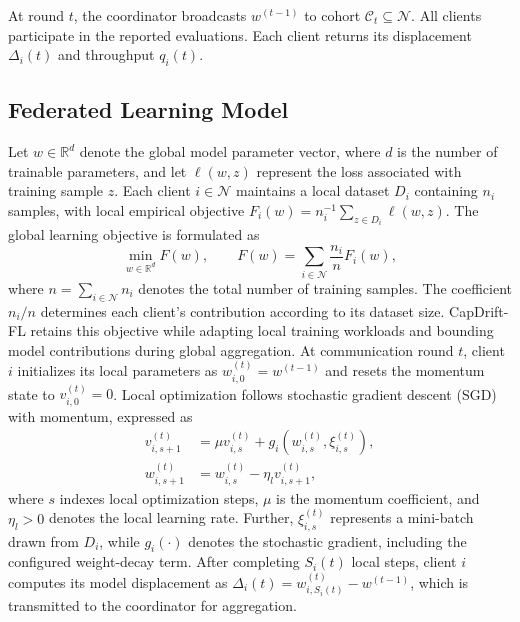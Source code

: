 \documentclass[conference]{IEEEtran}
\begin{document}
At round $t$, the coordinator broadcasts $w^{(t-1)}$ to cohort $\mathcal{C}_t\subseteq\mathcal{N}$. All clients participate in the reported evaluations. Each client returns its displacement $\Delta_i(t)$ and throughput $q_i(t)$.

\subsection{Federated Learning Model}
\label{subsec:learning}
Let $w\in\mathbb{R}^d$ denote the global
model parameter vector, where $d$ is the
number of trainable parameters, and let
$\ell(w,z)$ represent the loss associated with training sample $z$. Each client $i\in\mathcal{N}$ maintains a local dataset $D_i$ containing
$n_i$ samples, with local empirical objective
$F_i(w)=n_i^{-1}\sum_{z\in D_i}\ell(w,z)$.
The global learning objective is formulated as
\begin{equation}
\min_{w\in\mathbb{R}^d}
F(w), \qquad
F(w)=\sum_{i\in\mathcal{N}}
\frac{n_i}{n}F_i(w),
\label{eq:objective}
\end{equation}
where $n=\sum_{i\in\mathcal{N}}n_i$
denotes the total number of training samples. The coefficient $n_i/n$
determines each client's contribution according to its dataset size.
CapDrift-FL retains this objective while adapting local training workloads and bounding model contributions during global aggregation.
At communication round $t$, client $i$
initializes its local parameters as
$w_{i,0}^{(t)}=w^{(t-1)}$ and resets the
momentum state to $v_{i,0}^{(t)}=0$.
Local optimization follows stochastic
gradient descent (SGD) with momentum,
expressed as
\begin{align}
v_{i,s+1}^{(t)}
&=\mu v_{i,s}^{(t)}
+g_i\!\left(w_{i,s}^{(t)},
\xi_{i,s}^{(t)}\right),
\label{eq:velocity}\\
w_{i,s+1}^{(t)}
&=w_{i,s}^{(t)}
-\eta_l v_{i,s+1}^{(t)},
\label{eq:localsgd}
\end{align}
where $s$ indexes local optimization steps, $\mu$ is the momentum coefficient, and $\eta_l>0$ denotes the local learning rate. Further, $\xi_{i,s}^{(t)}$ represents a mini-batch drawn from $D_i$, while $g_i(\cdot)$ denotes the stochastic gradient, including the configured weight-decay term. After completing
$S_i(t)$ local steps, client $i$
computes its model displacement as $\Delta_i(t)=w_{i,S_i(t)}^{(t)}
-w^{(t-1)}$, which is transmitted
to the coordinator for aggregation.
\end{document}
